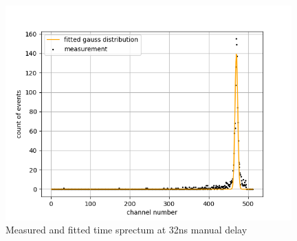 \begin{figure}[H]
    \centering
    \includegraphics[width=110mm,scale=0.5]{Positronium/include/timecalibration8.png}
    \caption{Measured and fitted time sprectum at 32ns manual delay} 
    \label{fig:0nsnofit}
\end{figure}
